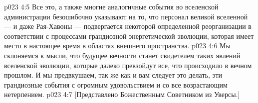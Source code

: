 \vs p023 4:5 \pc Все это, а также многие аналогичные события во вселенской администрации безошибочно указывают на то, что персонал великой вселенной --- и даже Рая\hyp{}Хавоны --- подвергается некоторой определенной реорганизации в соответствии с процессами грандиозной энергетической эволюции, которая имеет место в настоящее время в областях внешнего пространства.
\vs p023 4:6 Мы склоняемся к мысли, что будущее вечности станет свидетелем таких явлений вселенской эволюции, которые далеко превзойдут все, что происходило в вечном прошлом. И мы предвкушаем, так же как и вам следует это делать, эти грандиозные события с огромным удовольствием и со все возрастающим нетерпением.
\vsetoff
\vs p023 4:7 [Представлено Божественным Советником из Уверсы.]
